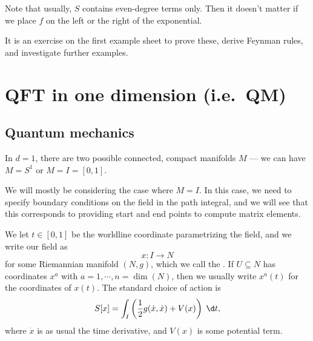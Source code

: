\documentclass[a4paper]{article}
\begin{document}
Note that usually, $S$ contains even-degree terms only. Then it doesn't matter if we place $f$ on the left or the right of the exponential.

It is an exercise on the first example sheet to prove these, derive Feynman rules, and investigate further examples.
\section{QFT in one dimension (i.e.\ QM)}
\subsection{Quantum mechanics}
In $d = 1$, there are two possible connected, compact manifolds $M$ --- we can have $M = S^1$ or $M = I = [0, 1]$.
\begin{center}
\end{center}
We will mostly be considering the case where $M = I$. In this case, we need to specify boundary conditions on the field in the path integral, and we will see that this corresponds to providing start and end points to compute matrix elements.

We let $t \in [0, 1]$ be the worldline coordinate parametrizing the field, and we write our field as
\[
  x: I \to N
\]
for some Riemannian manifold $(N, g)$, which we call the . If $U\subseteq N$ has coordinates $x^a$ with $a = 1, \cdots, n = \dim (N)$, then we usually write $x^a(t)$ for the coordinates of $x(t)$. The standard choice of action is
\[
  S[x] = \int_I \left(\frac{1}{2} g(\dot{x}, \dot{x}) + V(x)\right)\;\d t,
\]
where $\dot{x}$ is as usual the time derivative, and $V(x)$ is some potential term.
\end{document}
